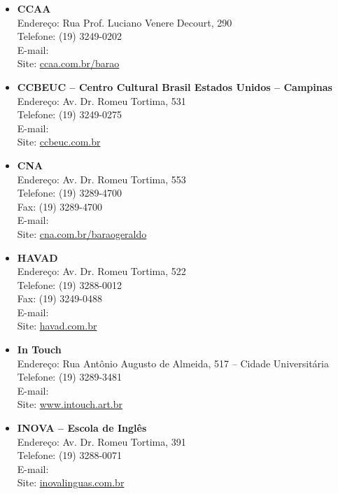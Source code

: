 \begin{itemize}
    \item   \textbf{CCAA}
        \\Endereço: Rua Prof. Luciano Venere Decourt, 290
        \\Telefone: (19) 3249-0202
        \\E-mail: 
        \\Site: \url{ccaa.com.br/barao}

    \item   \textbf{CCBEUC -- Centro Cultural Brasil Estados Unidos -- Campinas}
        \\Endereço: Av. Dr. Romeu Tortima, 531
        \\Telefone: (19) 3249-0275
        \\E-mail: 
        \\Site: \url{ccbeuc.com.br}

    \item   \textbf{CNA}
        \\Endereço: Av. Dr. Romeu Tortima, 553
        \\Telefone: (19) 3289-4700
        \\Fax: (19) 3289-4700
        \\E-mail: 
        \\Site: \url{cna.com.br/baraogeraldo}

    \item   \textbf{HAVAD}
        \\Endereço: Av. Dr. Romeu Tortima, 522
        \\Telefone: (19) 3288-0012
        \\Fax: (19) 3249-0488
        \\E-mail: 
        \\Site: \url{havad.com.br}

    \item   \textbf{In Touch}
        \\Endereço: Rua Antônio Augusto de Almeida, 517 -- Cidade Universitária
        \\Telefone: (19) 3289-3481
        \\E-mail: 
        \\Site: \url{www.intouch.art.br}

    \item   \textbf{INOVA -- Escola de Inglês}
        \\Endereço: Av. Dr. Romeu Tortima, 391
        \\Telefone: (19) 3288-0071
        \\E-mail: 
        \\Site: \url{inovalinguas.com.br}


\end{itemize}
